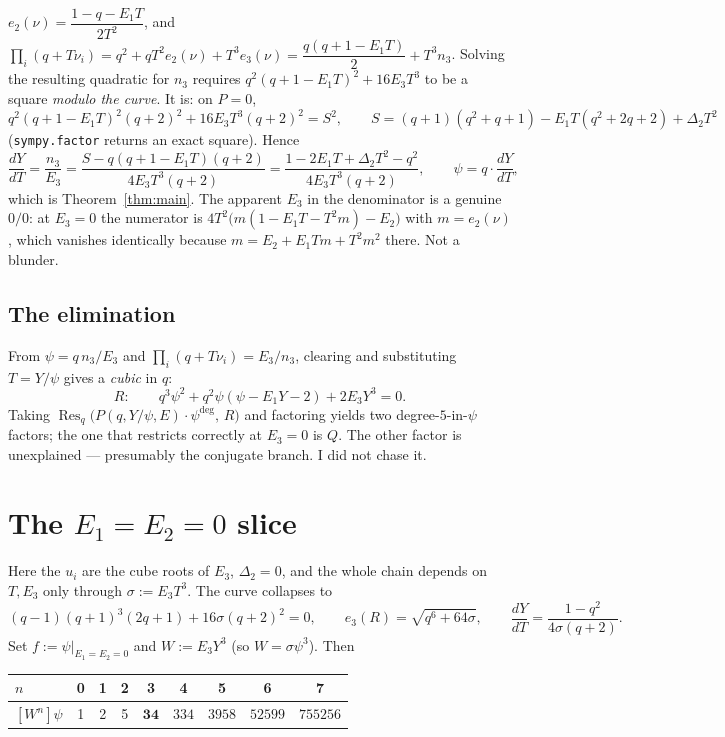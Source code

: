 \documentclass[11pt,a4paper]{article}
\DeclareMathOperator{\Res}{Res}
\theoremstyle{plain}
\theoremstyle{definition}
\begin{document}
$e_2(\nu)=\dfrac{1-q-E_1T}{2T^2}$, and
$\prod_i(q+T\nu_i)=q^2+qT^2e_2(\nu)+T^3e_3(\nu)=\dfrac{q(q+1-E_1T)}{2}+T^3n_3$.
Solving the resulting quadratic for $n_3$ requires
$q^2(q+1-E_1T)^2+16E_3T^3$ to be a square \emph{modulo the curve}. It is: on $P=0$,
\[
q^2(q+1-E_1T)^2(q+2)^2+16E_3T^3(q+2)^2=S^2,\qquad
S=(q+1)(q^2+q+1)-E_1T(q^2+2q+2)+\Delta_2T^2
\]
(\texttt{sympy.factor} returns an exact square). Hence
\[
\frac{dY}{dT}=\frac{n_3}{E_3}
=\frac{S-q(q+1-E_1T)(q+2)}{4E_3T^3(q+2)}
=\frac{1-2E_1T+\Delta_2T^2-q^2}{4E_3T^3(q+2)},
\qquad \psi=q\cdot\frac{dY}{dT},
\]
which is Theorem~\ref{thm:main}. The apparent $E_3$ in the denominator is a genuine $0/0$:
at $E_3=0$ the numerator is $4T^2\bigl(m(1-E_1T-T^2m)-E_2\bigr)$ with $m=e_2(\nu)$, which
vanishes identically because $m=E_2+E_1Tm+T^2m^2$ there. Not a blunder.

\subsection{The elimination}

From $\psi=q\,n_3/E_3$ and $\prod_i(q+T\nu_i)=E_3/n_3$, clearing and substituting
$T=Y/\psi$ gives a \emph{cubic} in $q$:
\[
R:\qquad q^3\psi^2+q^2\psi(\psi-E_1Y-2)+2E_3Y^3=0 .
\]
Taking $\Res_q\bigl(P(q,Y/\psi,E)\cdot\psi^{\deg},\,R\bigr)$ and factoring yields two
degree-$5$-in-$\psi$ factors; the one that restricts correctly at $E_3=0$ is $Q$. The other
factor is unexplained --- presumably the conjugate branch. I did not chase it.

\section{The $E_1=E_2=0$ slice}
\label{sec:slice}

Here the $u_i$ are the cube roots of $E_3$, $\Delta_2=0$, and the whole chain depends on
$T,E_3$ only through $\sigma:=E_3T^3$. The curve collapses to
\[
(q-1)(q+1)^3(2q+1)+16\sigma(q+2)^2=0,\qquad
e_3(R)=\sqrt{q^6+64\sigma},\qquad \frac{dY}{dT}=\frac{1-q^2}{4\sigma(q+2)} .
\]
Set $f:=\psi|_{E_1=E_2=0}$ and $W:=E_3Y^3$ (so $W=\sigma\psi^3$). Then

\begin{center}
\begin{tabular}{@{}l|cccccccc@{}}
\toprule
$n$ & 0 & 1 & 2 & 3 & 4 & 5 & 6 & 7\\
\midrule
$[W^n]\psi$ & 1 & 2 & 5 & $\mathbf{34}$ & $334$ & $3958$ & $52599$ & $755256$\\
\bottomrule
\end{tabular}
\end{center}
\end{document}
